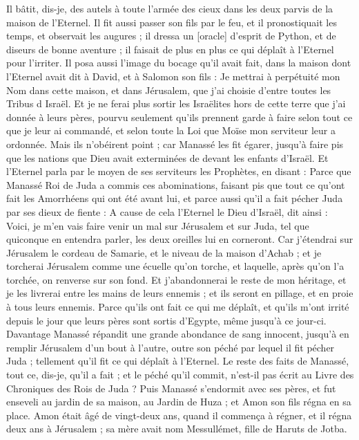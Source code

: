 \begin{multicols}{2}
Il bâtit, dis-je, des autels à toute l'armée des cieux dans les deux parvis de la maison de l'Eternel.
Il fit aussi passer son fils par le feu, et il pronostiquait les temps, et observait les augures ; il dressa un [oracle] d'esprit de Python, et de diseurs de bonne aventure ; il faisait de plus en plus ce qui déplaît à l'Eternel pour l'irriter.
Il posa aussi l'image du bocage qu'il avait fait, dans la maison dont l'Eternel avait dit à David, et à Salomon son fils : Je mettrai à perpétuité mon Nom dans cette maison, et dans Jérusalem, que j'ai choisie d'entre toutes les Tribus d Israël.
Et je ne ferai plus sortir les Israëlites hors de cette terre que j'ai donnée à leurs pères, pourvu seulement qu'ils prennent garde à faire selon tout ce que je leur ai commandé, et selon toute la Loi que Moïse mon serviteur leur a ordonnée.
Mais ils n'obéirent point ; car Manassé les fit égarer, jusqu'à faire pis que les nations que Dieu avait exterminées de devant les enfants d'Israël.
Et l'Eternel parla par le moyen de ses serviteurs les Prophètes, en disant :
Parce que Manassé Roi de Juda a commis ces abominations, faisant pis que tout ce qu'ont fait les Amorrhéens qui ont été avant lui, et parce aussi qu'il a fait pécher Juda par ses dieux de fiente :
A cause de cela l'Eternel le Dieu d'Israël, dit ainsi : Voici, je m'en vais faire venir un mal sur Jérusalem et sur Juda, tel que quiconque en entendra parler, les deux oreilles lui en corneront.
Car j'étendrai sur Jérusalem le cordeau de Samarie, et le niveau de la maison d'Achab ; et je torcherai Jérusalem comme une écuelle qu'on torche, et laquelle, après qu'on l'a torchée, on renverse sur son fond.
Et j'abandonnerai le reste de mon héritage, et je les livrerai entre les mains de leurs ennemis ; et ils seront en pillage, et en proie à tous leurs ennemis.
Parce qu'ils ont fait ce qui me déplaît, et qu'ils m'ont irrité depuis le jour que leurs pères sont sortis d'Egypte, même jusqu'à ce jour-ci.
Davantage Manassé répandit une grande abondance de sang innocent, jusqu'à en remplir Jérusalem d'un bout à l'autre, outre son péché par lequel il fit pécher Juda ; tellement qu'il fit ce qui déplaît à l'Eternel.
Le reste des faits de Manassé, tout ce, dis-je, qu'il a fait ; et le péché qu'il commit, n'est-il pas écrit au Livre des Chroniques des Rois de Juda ?
Puis Manassé s'endormit avec ses pères, et fut enseveli au jardin de sa maison, au Jardin de Huza ; et Amon son fils régna en sa place.
Amon était âgé de vingt-deux ans, quand il commença à régner, et il régna deux ans à Jérusalem ; sa mère avait nom Messullémet, fille de Haruts de Jotba.

\end{multicols}
